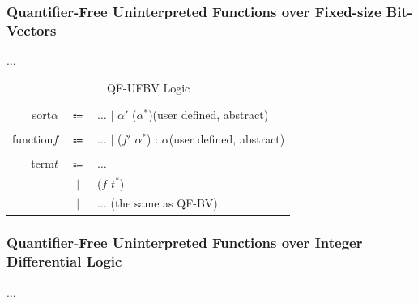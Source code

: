 \documentclass[10pt,letter]{article}
\theoremstyle{definition}
\begin{document}
\subsubsection{Quantifier-Free Uninterpreted Functions over Fixed-size Bit-Vectors}
...

\begin{table}[!h]
\begin{mdframed}
\centering
\begin{tabular}{r c l}
sort\qquad $\alpha$ & $\Coloneqq$ & $\ldots$ $\mid$ $\alpha'$ ($\alpha^*$)\rm\qquad(user defined, abstract)\\
\\
function\qquad $f$ & $\Coloneqq$ & $\ldots$ $\mid$ \rm ($f'$ $\alpha^*$) : $\alpha$\qquad(user defined, abstract)\\
\\
term\qquad $t$ & $\Coloneqq$ & $\ldots$ \\
& $\mid$ & ($f$ $t^*$)\\
& $\mid$ & $\ldots$ \qquad(\rm the same as QF-BV)\\
\end{tabular}
\end{mdframed}
\caption{QF-UFBV Logic}
\end{table}

\subsubsection{Quantifier-Free Uninterpreted Functions over Integer Differential Logic}
...
\end{document}
